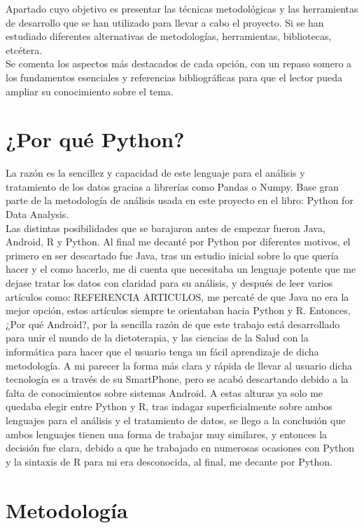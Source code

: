 
Apartado cuyo objetivo es presentar las técnicas metodológicas y las herramientas de desarrollo que se han utilizado para llevar a cabo el proyecto. Si se han estudiado diferentes alternativas de metodologías, herramientas, bibliotecas, etcétera.\\

Se comenta los aspectos más destacados de cada opción, con un repaso somero a los fundamentos esenciales y referencias bibliográficas para que el lector pueda ampliar su conocimiento sobre el tema.
\section{¿Por qué Python?}
La razón es la sencillez y capacidad de este lenguaje para el análisis y tratamiento de los datos gracias a librerías como Pandas o Numpy. Base gran parte de la metodología de análisis usada en este proyecto en el libro: Python for Data Analysis. \cite{pythonDataAnalisis}
\\ 
Las distintas posibilidades que se barajaron antes de empezar fueron Java, Android, R y Python. Al final me decanté por Python por diferentes motivos, el primero en ser descartado fue Java, tras un estudio inicial sobre lo que quería hacer y el como hacerlo, me di cuenta que necesitaba un lenguaje potente que me dejase tratar los datos con claridad para su análisis, y después de leer varios artículos como: REFERENCIA ARTICULOS, me percaté de que Java no era la mejor opción, estos artículos siempre te orientaban hacia Python y R. Entonces, ¿Por qué Android?, por la sencilla razón de que este trabajo está desarrollado para unir el mundo de la dietoterapia, y las ciencias de la Salud con la informática para hacer que el usuario tenga un fácil aprendizaje de dicha metodología. A mi parecer la forma más clara y rápida de llevar al usuario dicha tecnología es a través de su SmartPhone, pero se acabó descartando debido a la falta de conocimientos sobre sistemas Android. A estas alturas ya solo me quedaba elegir entre Python y R, tras indagar superficialmente sobre ambos lenguajes para el análisis y el tratamiento de datos, se llego a la conclusión que ambos lenguajes tienen una forma de trabajar muy similares, y entonces la decisión fue clara, debido a que he trabajado en numerosas ocasiones con Python y la sintaxis de R para mi era desconocida, al final, me decante por Python.
\section{Metodología}
